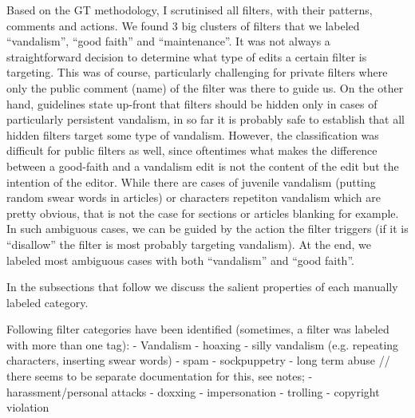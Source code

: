 Based on the GT methodology, I scrutinised all filters, with their patterns, comments and actions. %
We found 3 big clusters of filters that we labeled ``vandalism'', ``good faith'' and ``maintenance''.
It was not always a straightforward decision to determine what type of edits a certain filter is targeting.
This was of course, particularly challenging for private filters where only the public comment (name) of the filter was there to guide us.
On the other hand, guidelines state up-front that filters should be hidden only in cases of particularly persistent vandalism, in so far it is probably safe to establish that all hidden filters target some type of vandalism.
However, the classification was difficult for public filters as well, since oftentimes what makes the difference between a good-faith and a vandalism edit is not the content of the edit but the intention of the editor.
While there are cases of juvenile vandalism (putting random swear words in articles) or characters repetiton vandalism which are pretty obvious, that is not the case for sections or articles blanking for example. %
In such ambiguous cases, we can be guided by the action the filter triggers (if it is ``disallow'' the filter is most probably targeting vandalism).
At the end, we labeled most ambiguous cases with both ``vandalism'' and ``good faith''.

In the subsections that follow we discuss the salient properties of each manually labeled category.

\begin{comment}
    \item how often were (which) filters triggered: see \url{filter-lists/20190106115600_filters-sorted-by-hits.csv} and~\ref{tab:most-active-actions}; see also jupyter notebook for aggregated hitcounts over tagged categories
    \item percentage filters of different types over the years: according to actions (I need a complete abuse\_filter\_log table for this!); according to self-assigned tags %
\end{comment}

Following filter categories have been identified (sometimes, a filter was labeled with more than one tag):
- Vandalism
  - hoaxing
  - silly vandalism (e.g. repeating characters, inserting swear words)
  - spam
  - sockpuppetry
  - long term abuse // there seems to be separate documentation for this, see notes;
  - harassment/personal attacks
    - doxxing
    - impersonation
  - trolling
  - copyright violation

